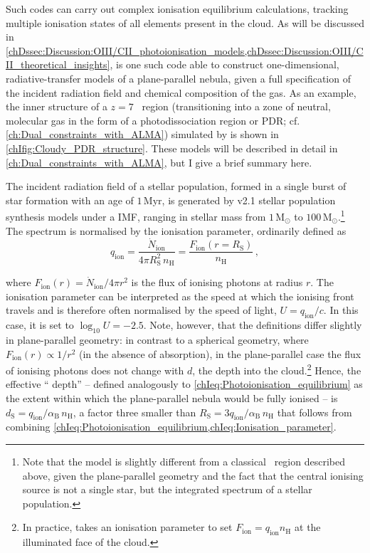 Such codes can carry out complex ionisation equilibrium calculations, tracking multiple ionisation states of all elements present in the cloud. As will be discussed in \cref{chDssec:Discussion:OIII/CII_photoionisation_models,chDssec:Discussion:OIII/CII_theoretical_insights},  \citep[e.g.][]{2017RMxAA..53..385F} is one such code able to construct one-dimensional, radiative-transfer models of a plane-parallel nebula, given a full specification of the incident radiation field and chemical composition of the gas. As an example, the inner structure of a $z = 7$ \HII\ region (transitioning into a zone of neutral, molecular gas in the form of a photodissociation region or PDR; cf. \cref{ch:Dual_constraints_with_ALMA}) simulated by  is shown in \cref{chIfig:Cloudy_PDR_structure}. These models will be described in detail in \cref{ch:Dual_constraints_with_ALMA}, but I give a brief summary here.

The incident radiation field of a stellar population, formed in a single burst of star formation with an age of $1 \, \mathrm{Myr}$, is generated by  v2.1 stellar population synthesis models \citep[including binary stars;][]{2017PASA...34...58E} under a \citeauthor{1955ApJ...121..161S} IMF, ranging in stellar mass from $1 \, \mathrm{M_\odot}$ to $100 \, \mathrm{M_\odot}$.\footnote{Note that the model is slightly different from a classical \HII\ region described above, given the plane-parallel geometry and the fact that the central ionising source is not a single star, but the integrated spectrum of a stellar population.} The spectrum is normalised by the ionisation parameter, ordinarily defined as
\begin{equation}
    \label{chIeq:Ionisation_parameter}
    q_\text{ion} = \frac{\dot{N}_\text{ion}}{4 \pi R_\text{S}^2 \, n_\text{H}} = \frac{F_\text{ion} (r=R_\text{S})}{n_\text{H}} \, ,
\end{equation}

\noindent where $F_\text{ion} (r) = \dot{N}_\text{ion} / 4 \pi r^2$ is the flux of ionising photons at radius $r$. The ionisation parameter can be interpreted as the speed at which the ionising front travels and is therefore often normalised by the speed of light, $U = q_\text{ion} / c$. In this case, it is set to $\log_{10} U = -2.5$. Note, however, that the definitions differ slightly in plane-parallel geometry: in contrast to a spherical geometry, where $F_\text{ion} (r) \propto 1/r^2$ (in the absence of absorption), in the plane-parallel case the flux of ionising photons does not change with $d$, the depth into the cloud.\footnote{In practice,  takes an ionisation parameter to set $F_\text{ion} = q_\text{ion} n_\text{H}$ at the illuminated face of the cloud.} Hence, the effective ``\citeauthor{1939ApJ....89..526S} depth'' -- defined analogously to \cref{chIeq:Photoionisation_equilibrium} as the extent within which the plane-parallel nebula would be fully ionised -- is $d_\text{S} = q_\text{ion}/\alpha_\text{B} \, n_\text{H}$, a factor three smaller than $R_\text{S} = 3q_\text{ion}/\alpha_\text{B} \, n_\text{H}$ that follows from combining \cref{chIeq:Photoionisation_equilibrium,chIeq:Ionisation_parameter}.

